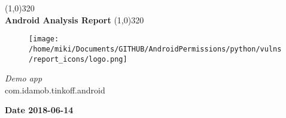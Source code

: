 \documentclass[12p]{article}
\begin{document}
\begin{titlepage}
\begin{center}
\line(1,0){320}\\
[0.25in]
\huge{\bfseries Android Analysis Report}
\line(1,0){320}\\
[0.5in]
\begin{figure}[H]
	\centering
	\texttt{[image: /home/miki/Documents/GITHUB/AndroidPermissions/python/vulns/report\_icons/logo.png]}
\end{figure}
\textsl{\LARGE Demo app}\\
\textsf{\LARGE com.idamob.tinkoff.android}\\
[2.5in]
\end{center}
\begin{flushright}
\textbf{\large Date 2018-06-14}
\end{flushright}
\end{titlepage}
\tableofcontents
\thispagestyle{empty}
\cleardoublepage
\setcounter{page}{1}
\end{document}
